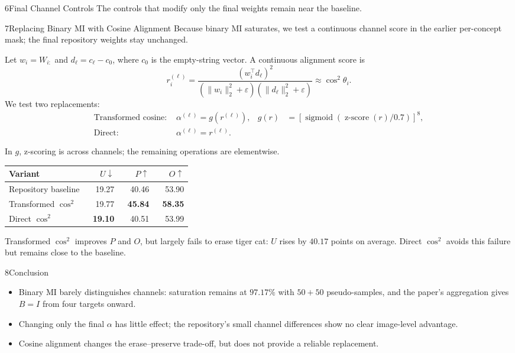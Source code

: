 \documentclass[final]{beamer}
\newlength{\colwidth}
\newcommand{\tablefont}{\fontsize{22}{26}\selectfont}
\newcommand{\smalltext}{\fontsize{20}{24}\selectfont}
\newcommand{\blocktext}{\RaggedRight\setlength{\parindent}{0pt}\noindent}
\begin{document}
\begin{frame}[t]
\begin{columns}[t,totalwidth=\paperwidth]
\begin{column}{\colwidth}
\begin{block}{6\quad Final Channel Controls}
\smalltext
The controls that modify only the final weights remain near the baseline.
\end{block}

\begin{block}{7\quad Replacing Binary MI with Cosine Alignment}
\blocktext
Because binary MI saturates, we test a continuous channel score in the earlier per-concept mask; the final repository weights stay unchanged.

Let $w_i=W_{i:}$ and $d_\ell=c_\ell-c_0$, where $c_0$ is the empty-string vector. A continuous alignment score is
\[
r_i^{(\ell)}=
\frac{(w_i^\top d_\ell)^2}
{(\lVert w_i\rVert_2^2+\varepsilon)
 (\lVert d_\ell\rVert_2^2+\varepsilon)}
\approx\cos^2\theta_i.
\]
We test two replacements:
\[
\begin{aligned}
\text{Transformed cosine: }&\alpha^{(\ell)}=g(r^{(\ell)}),
&g(r)&=\left[\operatorname{sigmoid}\!\left(
\operatorname{z\text{-}score}(r)/0.7\right)\right]^8,\\
\text{Direct: }&\alpha^{(\ell)}=r^{(\ell)}.
\end{aligned}
\]
{\smalltext In $g$, z-scoring is across channels; the remaining operations are elementwise.\par}

\begin{center}
\tablefont
\renewcommand{\arraystretch}{1.16}
\begin{tabular}{p{0.43\linewidth}rrr}
\toprule
Variant & $U\downarrow$ & $P\uparrow$ & $O\uparrow$ \\
\midrule
Repository baseline & 19.27 & 40.46 & 53.90 \\
Transformed $\cos^2$ & 19.77 & \textbf{45.84} & \textbf{58.35} \\
Direct $\cos^2$ & \textbf{19.10} & 40.51 & 53.99 \\
\bottomrule
\end{tabular}
\end{center}

\smalltext
Transformed $\cos^2$ improves $P$ and $O$, but largely fails to erase tiger cat: $U$ rises by $40.17$ points on average. Direct $\cos^2$ avoids this failure but remains close to the baseline.
\end{block}

\begin{alertblock}{8\quad Conclusion}
\blocktext
\begin{itemize}
  \setlength{\itemsep}{0.20em}
  \item Binary MI barely distinguishes channels: saturation remains at $97.17\%$ with $50+50$ pseudo-samples, and the paper's aggregation gives $B=I$ from four targets onward.
  \item Changing only the final $\alpha$ has little effect; the repository's small channel differences show no clear image-level advantage.
  \item Cosine alignment changes the erase--preserve trade-off, but does not provide a reliable replacement.
\end{itemize}


\end{alertblock}
\end{column}
\end{columns}
\end{frame}
\end{document}
